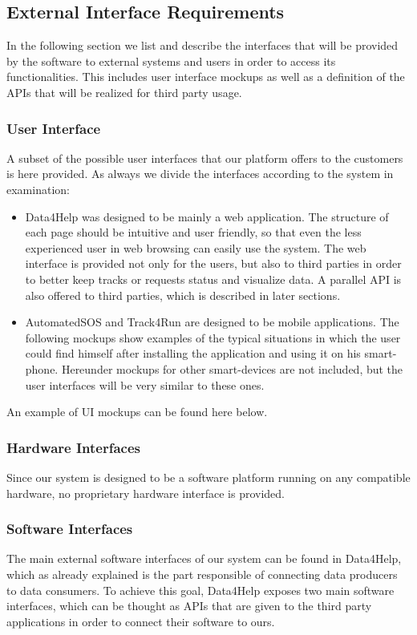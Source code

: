 \subsection{External Interface Requirements}
In the following section we list and describe the interfaces that will be provided by the software to external systems and users in order to access its functionalities. This includes user interface mockups as well as a definition of the APIs that will be realized for third party usage.

\subsubsection{User Interface}
A subset of the possible user interfaces that our platform offers to the customers is here provided. As always we divide the interfaces according to the system in examination:

\begin{itemize}
	\item Data4Help was designed to be mainly a web application. The structure of each page should be intuitive and user friendly, so that even the less experienced user in web browsing can easily use the system.
	The web interface is provided not only for the users, but also to third parties in order to better keep tracks or requests status and visualize data. A parallel API is also offered to third parties, which is described in later sections.
	\item AutomatedSOS and Track4Run are designed to be mobile applications. The following mockups show examples of the typical situations in which the user could find himself after installing the application and using it on his smart-phone. Hereunder mockups for other smart-devices are not included, but the user interfaces will be very similar to these ones. 
\end{itemize}

An example of UI mockups can be found here below.

\FloatBarrier

\FloatBarrier

\subsubsection{Hardware Interfaces}
Since our system is designed to be a software platform running on any compatible hardware, no proprietary hardware interface is provided.

\subsubsection{Software Interfaces}
The main external software interfaces of our system can be found in Data4Help, which as already explained is the part responsible of connecting data producers to data consumers.
To achieve this goal, Data4Help exposes two main software interfaces, which can be thought as APIs that are given to the third party applications in order to connect their software to ours.

